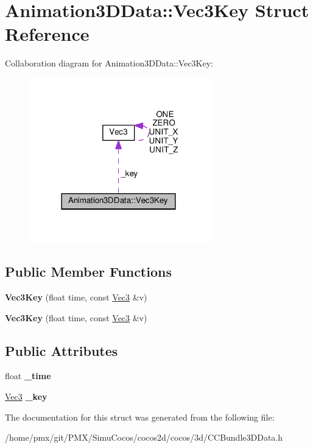 \hypertarget{structAnimation3DData_1_1Vec3Key}{}\section{Animation3\+D\+Data\+:\+:Vec3\+Key Struct Reference}
\label{structAnimation3DData_1_1Vec3Key}


Collaboration diagram for Animation3\+D\+Data\+:\+:Vec3\+Key\+:
\nopagebreak
\begin{figure}[H]
\begin{center}
\leavevmode
\includegraphics[width=225pt]{structAnimation3DData_1_1Vec3Key__coll__graph}
\end{center}
\end{figure}
\subsection*{Public Member Functions}
\begin{DoxyCompactItemize}
\item 
\mbox{\label{structAnimation3DData_1_1Vec3Key_a90eefe16c830bff8fe20b2b91bd567f6}} 
{\bfseries Vec3\+Key} (float time, const \hyperlink{classVec3}{Vec3} \&v)
\item 
\mbox{\label{structAnimation3DData_1_1Vec3Key_a90eefe16c830bff8fe20b2b91bd567f6}} 
{\bfseries Vec3\+Key} (float time, const \hyperlink{classVec3}{Vec3} \&v)
\end{DoxyCompactItemize}
\subsection*{Public Attributes}
\begin{DoxyCompactItemize}
\item 
\mbox{\label{structAnimation3DData_1_1Vec3Key_ac656e17dde13e2cb42068e8a794dc6f3}} 
float {\bfseries \+\_\+time}
\item 
\mbox{\label{structAnimation3DData_1_1Vec3Key_a57b3a0ac49c8ae5ebe98d496cea186f2}} 
\hyperlink{classVec3}{Vec3} {\bfseries \+\_\+key}
\end{DoxyCompactItemize}


The documentation for this struct was generated from the following file\+:\begin{DoxyCompactItemize}
\item 
/home/pmx/git/\+P\+M\+X/\+Simu\+Cocos/cocos2d/cocos/3d/C\+C\+Bundle3\+D\+Data.\+h\end{DoxyCompactItemize}
